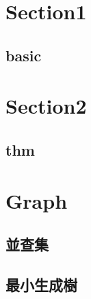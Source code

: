 \section{Section1}
    \subsection{basic}
        

\section{Section2}
    \subsection{thm}
        

\section{Graph}
        \subsection{並查集}
            
        \subsection{最小生成樹}
            
    